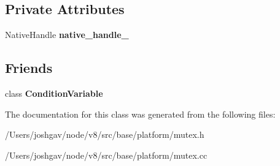 \subsection*{Private Attributes}
\begin{DoxyCompactItemize}
\item 
Native\+Handle {\bfseries native\+\_\+handle\+\_\+}\hypertarget{classv8_1_1base_1_1_mutex_a6afad6e6bcb525752bfff8d6d9f0ae74}{}\label{classv8_1_1base_1_1_mutex_a6afad6e6bcb525752bfff8d6d9f0ae74}

\end{DoxyCompactItemize}
\subsection*{Friends}
\begin{DoxyCompactItemize}
\item 
class {\bfseries Condition\+Variable}\hypertarget{classv8_1_1base_1_1_mutex_ab270e49e575fdf0fe1a4f2ee911df116}{}\label{classv8_1_1base_1_1_mutex_ab270e49e575fdf0fe1a4f2ee911df116}

\end{DoxyCompactItemize}


The documentation for this class was generated from the following files\+:\begin{DoxyCompactItemize}
\item 
/\+Users/joshgav/node/v8/src/base/platform/mutex.\+h\item 
/\+Users/joshgav/node/v8/src/base/platform/mutex.\+cc\end{DoxyCompactItemize}
